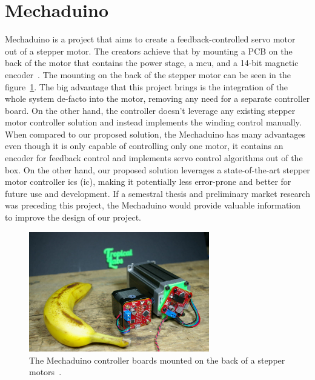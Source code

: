 \newpage
\section{Mechaduino}
\label{sec:mechaduino}
Mechaduino is a project that aims to create a feedback-controlled servo motor out of a stepper motor.
The creators achieve that by mounting a PCB on the back of the motor that contains the power stage, a \acs{mcu}, and a 14-bit magnetic encoder~\cite{tropical_labs_mechaduino_2021}.
The mounting on the back of the stepper motor can be seen in the figure~\ref{fig:mechaduino}.
The big advantage that this project brings is the integration of the whole system de-facto into the motor, removing any need for a separate controller board.
On the other hand, the controller doesn't leverage any existing stepper motor controller solution and instead implements the winding control manually.
When compared to our proposed solution, the Mechaduino has many advantages even though it is only capable of controlling only one motor, it contains an encoder for feedback control and implements servo control algorithms out of the box.
On the other hand, our proposed solution leverages a state-of-the-art stepper motor controller \acs{ic}s (\acl{ic}), making it potentially less error-prone and better for future use and development.
If a semestral thesis and preliminary market research was preceding this project, the Mechaduino would provide valuable information to improve the design of our project.

\begin{figure}[H]
    \centering
    \includegraphics[width=0.7\textwidth]{obrazky/mechaduino}
    \caption{The Mechaduino controller boards mounted on the back of a stepper motors~\cite{tropical_labs_mechaduino_2021}.}
    \label{fig:mechaduino}
\end{figure}

\newpage

